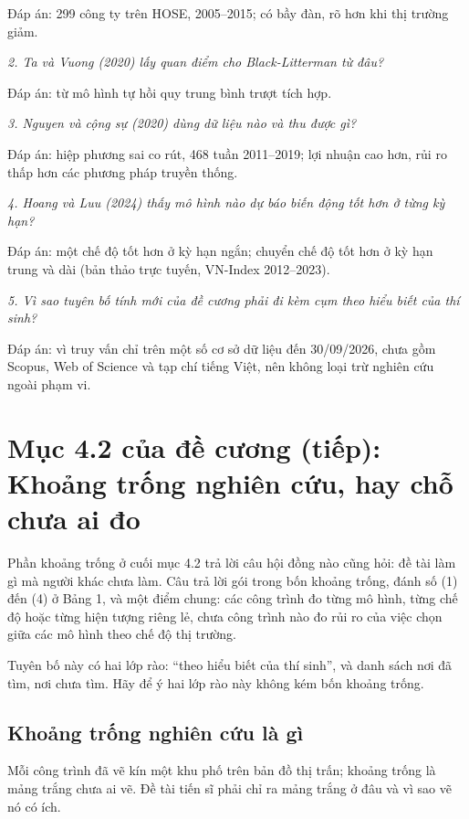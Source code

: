 Đáp án: 299 công ty trên HOSE, 2005--2015; có bầy đàn, rõ hơn khi thị trường giảm.

{\itshape 2. Ta và Vuong (2020) lấy quan điểm cho Black-Litterman từ đâu?\par}

Đáp án: từ mô hình tự hồi quy trung bình trượt tích hợp.

{\itshape 3. Nguyen và cộng sự (2020) dùng dữ liệu nào và thu được gì?\par}

Đáp án: hiệp phương sai co rút, 468 tuần 2011--2019; lợi nhuận cao hơn, rủi ro thấp hơn các phương pháp truyền thống.

{\itshape 4. Hoang và Luu (2024) thấy mô hình nào dự báo biến động tốt hơn ở từng kỳ hạn?\par}

Đáp án: một chế độ tốt hơn ở kỳ hạn ngắn; chuyển chế độ tốt hơn ở kỳ hạn trung và dài (bản thảo trực tuyến, VN-Index 2012--2023).

{\itshape 5. Vì sao tuyên bố tính mới của đề cương phải đi kèm cụm theo hiểu biết của thí sinh?\par}

Đáp án: vì truy vấn chỉ trên một số cơ sở dữ liệu đến 30/09/2026, chưa gồm Scopus, Web of Science và tạp chí tiếng Việt, nên không loại trừ nghiên cứu ngoài phạm vi.

\chapter{Mục 4.2 của đề cương (tiếp): Khoảng trống nghiên cứu, hay chỗ chưa ai đo}

Phần khoảng trống ở cuối mục 4.2 trả lời câu hội đồng nào cũng hỏi: đề tài làm gì mà người khác chưa làm. Câu trả lời gói trong bốn khoảng trống, đánh số (1) đến (4) ở Bảng 1, và một điểm chung: các công trình đo từng mô hình, từng chế độ hoặc từng hiện tượng riêng lẻ, chưa công trình nào đo rủi ro của việc chọn giữa các mô hình theo chế độ thị trường.

Tuyên bố này có hai lớp rào: “theo hiểu biết của thí sinh”, và danh sách nơi đã tìm, nơi chưa tìm. Hãy để ý hai lớp rào này không kém bốn khoảng trống.

\section{Khoảng trống nghiên cứu là gì}

Mỗi công trình đã vẽ kín một khu phố trên bản đồ thị trấn; khoảng trống là mảng trắng chưa ai vẽ. Đề tài tiến sĩ phải chỉ ra mảng trắng ở đâu và vì sao vẽ nó có ích.


